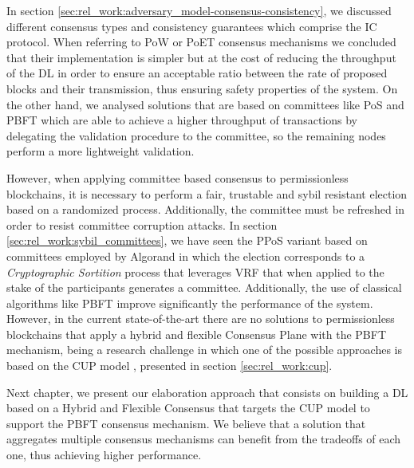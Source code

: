 




In section \ref{sec:rel_work:adversary_model-consensus-consistency}, we discussed different consensus types and consistency guarantees which comprise the \gls{IC} protocol. When referring to \gls{PoW} or \gls{PoET} consensus mechanisms we concluded that their implementation is simpler but at the cost of reducing the throughput of the \gls{DL} in order to ensure an acceptable ratio between the rate of proposed blocks and their transmission, thus ensuring safety properties of the system. On the other hand, we analysed solutions that are based on committees like \gls{PoS} and \gls{PBFT} which are able to achieve a higher throughput of transactions by delegating the validation procedure to the committee, so the remaining nodes perform a more lightweight validation.

However, when applying committee based consensus to permissionless blockchains, it is necessary to perform a fair, trustable and sybil resistant \cite{sybil_attack} election based on a randomized process. Additionally, the committee must be refreshed in order to resist committee corruption attacks. In section \ref{sec:rel_work:sybil_committees}, we have seen the \gls{PPoS} variant based on committees employed by Algorand \cite{algorand_scaling_bft_cryptocurrencies} in which the election corresponds to a \textit{Cryptographic Sortition} process that leverages \gls{VRF} that when applied to the stake of the participants generates a committee. Additionally, the use of classical algorithms like \gls{PBFT} improve significantly the performance of the system. However, in the current state-of-the-art there are no solutions to permissionless blockchains that apply a hybrid and flexible Consensus Plane with the \gls{PBFT} mechanism, being a research challenge in which one of the possible approaches is based on the \gls{CUP} model \cite{cup_model}, presented in section \ref{sec:rel_work:cup}.

Next chapter, we present our elaboration approach that consists on building a \gls{DL} based on a Hybrid and Flexible Consensus that targets the \gls{CUP} model to support the \gls{PBFT} consensus mechanism. We believe that a solution that aggregates multiple consensus mechanisms can benefit from the tradeoffs of each one, thus achieving higher performance.
 